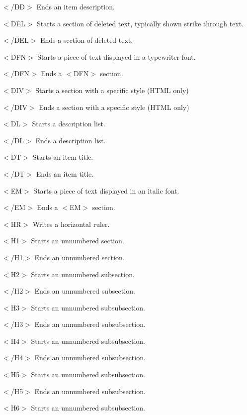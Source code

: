 \begin{DoxyItemize}
\item {\ttfamily $<$/\+DD$>$} Ends an item description. 
\item {\ttfamily $<$D\+EL$>$} Starts a section of deleted text, typically shown strike through text. 
\item {\ttfamily $<$/\+D\+EL$>$} Ends a section of deleted text. 
\item {\ttfamily $<$D\+FN$>$} Starts a piece of text displayed in a typewriter font. 
\item {\ttfamily $<$/\+D\+FN$>$} Ends a {\ttfamily $<$D\+FN$>$} section. 
\item {\ttfamily $<$D\+IV$>$} Starts a section with a specific style (H\+T\+ML only) 
\item {\ttfamily $<$/\+D\+IV$>$} Ends a section with a specific style (H\+T\+ML only) 
\item {\ttfamily $<$DL$>$} Starts a description list. 
\item {\ttfamily $<$/\+DL$>$} Ends a description list. 
\item {\ttfamily $<$DT$>$} Starts an item title. 
\item {\ttfamily $<$/\+DT$>$} Ends an item title. 
\item {\ttfamily $<$EM$>$} Starts a piece of text displayed in an italic font. 
\item {\ttfamily $<$/\+EM$>$} Ends a {\ttfamily $<$EM$>$} section. 
\item {\ttfamily $<$HR$>$} Writes a horizontal ruler. 
\item {\ttfamily $<$H1$>$} Starts an unnumbered section. 
\item {\ttfamily $<$/\+H1$>$} Ends an unnumbered section. 
\item {\ttfamily $<$H2$>$} Starts an unnumbered subsection. 
\item {\ttfamily $<$/\+H2$>$} Ends an unnumbered subsection. 
\item {\ttfamily $<$H3$>$} Starts an unnumbered subsubsection. 
\item {\ttfamily $<$/\+H3$>$} Ends an unnumbered subsubsection. 
\item {\ttfamily $<$H4$>$} Starts an unnumbered subsubsection. 
\item {\ttfamily $<$/\+H4$>$} Ends an unnumbered subsubsection. 
\item {\ttfamily $<$H5$>$} Starts an unnumbered subsubsection. 
\item {\ttfamily $<$/\+H5$>$} Ends an unnumbered subsubsection. 
\item {\ttfamily $<$H6$>$} Starts an unnumbered subsubsection. 

\end{DoxyItemize}
